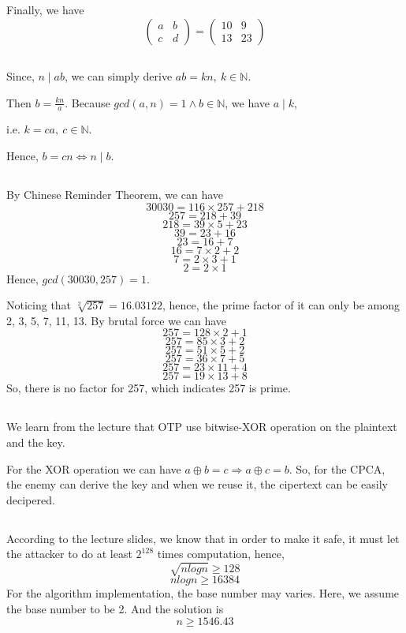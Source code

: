 \documentclass[12pt,a4paper]{article}
\theoremstyle{definition}
\begin{document}
Finally, we have 
$$
\left(\begin{array}{ll}
a & b \\
c & d
\end{array}\right) 
=
\left(\begin{array}{cc}
10 & 9 \\
13 & 23
\end{array}\right)
$$
\subsection{}
Since, $n\mid ab$, we can simply derive $ab=kn,\ k\in \mathbb{N}$. 

\noindent Then $b=\frac{kn}{a}$. Because $gcd(a,n)=1\land b\in \mathbb{N}$, we have $a\mid k$, 


\noindent i.e. $k=ca,\ c\in \mathbb{N}$. 

\noindent Hence, $b=cn\Leftrightarrow n\mid b$. 
\subsection{}
By Chinese Reminder Theorem, we can have 
$$30030=116\times 257+218$$
$$257=218+39$$
$$218=39\times 5+23$$
$$39=23+16$$
$$23=16+7$$
$$16=7\times 2 +2$$
$$7=2\times 3+1$$
$$2=2\times 1$$
Hence, $gcd(30030,257)=1$. 

Noticing that $\sqrt[2]{257}=16.03122$, hence, the prime factor of it can only be among 2, 3, 5, 7, 11, 13. By brutal force we can have 
$$257=128\times 2+1$$
$$257=85\times 3+2$$
$$257=51\times 5+2$$
$$257=36\times 7+5$$
$$257=23\times 11+4$$
$$257=19\times 13+8$$
So, there is no factor for 257, which indicates 257 is prime. 
\subsection{}
We learn from the lecture that OTP use bitwise-XOR operation on the plaintext and the key. 

For the XOR operation we can have $a\oplus b=c\Rightarrow a\oplus c=b$. So, for the CPCA, the enemy can derive the key and when we reuse it, the cipertext can be easily decipered. 
\subsection{}
According to the lecture slides, we know that in order to make it safe, it must let the attacker to do at least $2^128$ times computation, hence, 
$$\sqrt{nlogn}\geq128$$
$$nlogn\geq 16384$$
For the algorithm implementation, the base number may varies. Here, we assume the base number to be 2. And the solution is 
$$n\geq 1546.43$$
\end{document}
